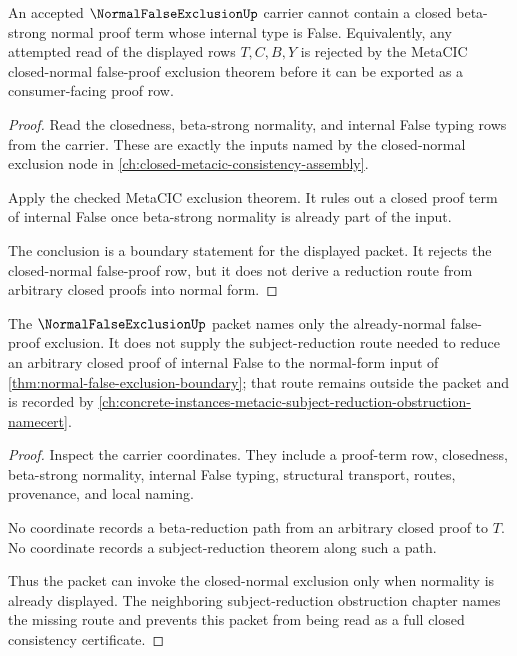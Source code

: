 \begin{theorem}
\label{thm:normal-false-exclusion-boundary}
An accepted $\NormalFalseExclusionUp$ carrier cannot contain a closed beta-strong normal proof term whose internal type is False. Equivalently, any attempted read of the displayed rows $T,C,B,Y$ is rejected by the MetaCIC closed-normal false-proof exclusion theorem before it can be exported as a consumer-facing proof row.
\end{theorem}
\begin{proof}
Read the closedness, beta-strong normality, and internal False typing rows from the carrier. These are exactly the inputs named by the closed-normal exclusion node in \autoref{ch:closed-metacic-consistency-assembly}.

Apply the checked MetaCIC exclusion theorem. It rules out a closed proof term of internal False once beta-strong normality is already part of the input.

The conclusion is a boundary statement for the displayed packet. It rejects the closed-normal false-proof row, but it does not derive a reduction route from arbitrary closed proofs into normal form.
\end{proof}

\begin{theorem}
\label{thm:normal-false-exclusion-subject-reduction-boundary}
The $\NormalFalseExclusionUp$ packet names only the already-normal false-proof exclusion. It does not supply the subject-reduction route needed to reduce an arbitrary closed proof of internal False to the normal-form input of \autoref{thm:normal-false-exclusion-boundary}; that route remains outside the packet and is recorded by \autoref{ch:concrete-instances-metacic-subject-reduction-obstruction-namecert}.
\end{theorem}
\begin{proof}
Inspect the carrier coordinates. They include a proof-term row, closedness, beta-strong normality, internal False typing, structural transport, routes, provenance, and local naming.

No coordinate records a beta-reduction path from an arbitrary closed proof to $T$. No coordinate records a subject-reduction theorem along such a path.

Thus the packet can invoke the closed-normal exclusion only when normality is already displayed. The neighboring subject-reduction obstruction chapter names the missing route and prevents this packet from being read as a full closed consistency certificate.
\end{proof}

